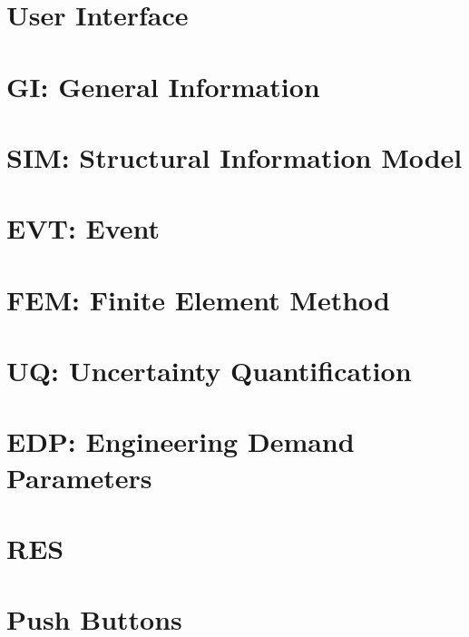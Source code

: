 \section{User Interface}


\section{GI: General Information}


\section{SIM: Structural Information Model}


\section{EVT: Event}


\section{FEM: Finite Element Method}


\section{UQ: Uncertainty Quantification}


\section{EDP: Engineering Demand Parameters}


\section{RES}


\section{Push Buttons}

